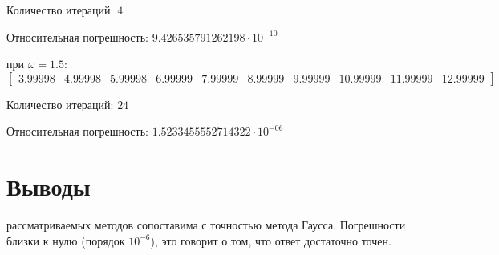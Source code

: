 \documentclass[12pt]{report}
\begin{document}
Количество итераций: $4$

Относительная погрешность: $9.426535791262198 \cdot 10^{-10}$

\vspace{0.5cm}
при $\omega = 1.5$: 
\[\begin{bmatrix}
     3.99998 & 4.99998 & 5.99998 & 6.99999 & 7.99999 & 8.99999 & 9.99999 & 10.99999 & 11.99999 & 12.99999
\end{bmatrix}\]

Количество итераций: $24$

Относительная погрешность: $1.5233455552714322 \cdot 10^{-06}$



\section{Выводы}

 рассматриваемых методов сопоставима с точностью метода Гаусса. Погрешности близки к нулю (порядок $10^{-6}$), это говорит о том, что ответ достаточно точен.
\end{document}
